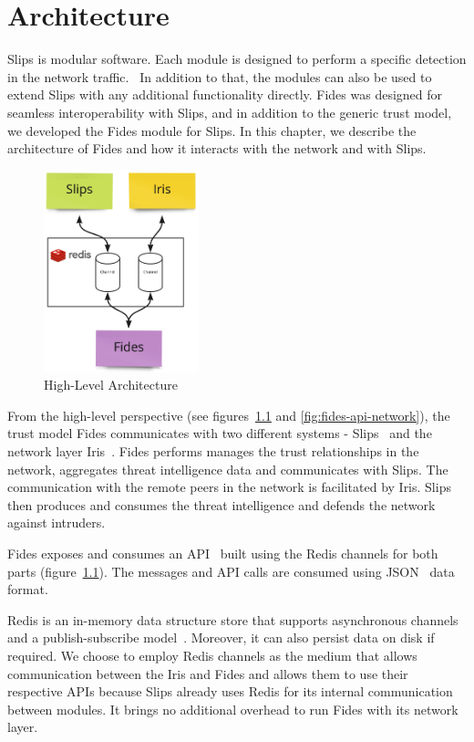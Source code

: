 \chapter{Architecture}
\label{ch:architecture}
Slips is modular software. Each module is designed to perform a specific detection in the network traffic.~\cite{slips}
In addition to that, the modules can also be used to extend Slips with any additional functionality directly. 
Fides was designed for seamless interoperability with Slips, and in addition to the generic trust model, we developed the Fides module for Slips.
In this chapter, we describe the architecture of Fides and how it interacts with the network and with Slips.

\begin{figure}[ht]
    \centering
    \includegraphics[width=0.4\textwidth]{assets/redis_channels.jpeg}
    \caption{High-Level Architecture}
    \label{fig:high-level-architecture}
\end{figure}

From the high-level perspective (see figures~\ref{fig:high-level-architecture} and \ref{fig:fides-api-network}), the trust model Fides  communicates with two different systems - Slips~\cite{slips} and the network layer Iris~\cite{nl}.
Fides performs manages the trust relationships in the network, aggregates threat intelligence data and communicates with Slips. The communication with the remote peers in the network is facilitated by Iris. 
Slips then produces and consumes the threat intelligence and defends the network against intruders.

Fides exposes and consumes an API~\cite{api} built using the Redis channels for both parts (figure~\ref{fig:high-level-architecture}).
The messages and API calls are consumed using JSON~\cite{json} data format.

Redis is an in-memory data structure store that supports asynchronous channels and a publish-subscribe model~\cite{redis}. Moreover, it can also persist data on disk if required.
We choose to employ Redis channels as the medium that allows communication between the Iris and Fides and allows them to use their respective APIs because Slips already uses Redis for its internal communication between modules. It brings no additional overhead to run Fides with its network layer.



